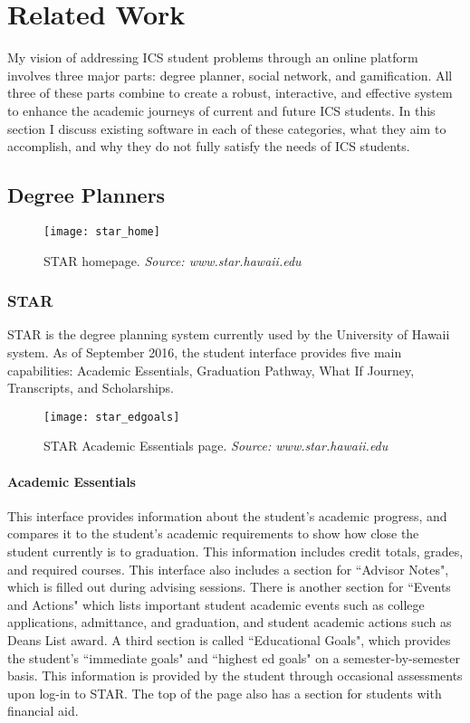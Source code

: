 \chapter{Related Work}

My vision of addressing ICS student problems through an online platform involves three major parts: degree planner, social network, and gamification. All three of these parts combine to create a robust, interactive, and effective system to enhance the academic journeys of current and future ICS students. In this section I discuss existing software in each of these categories, what they aim to accomplish, and why they do not fully satisfy the needs of ICS students.

\section{Degree Planners}
\begin{figure}[h]
\centering
\texttt{[image: star\_home]}
\caption{STAR homepage. \textit{Source: www.star.hawaii.edu}}
\end{figure}
\subsection{STAR}
STAR is the degree planning system currently used by the University of Hawaii system. \cite{STAR} As of September 2016, the student interface provides five main capabilities: Academic Essentials, Graduation Pathway, What If Journey, Transcripts, and Scholarships. 

\begin{figure}[h]
\centering
\texttt{[image: star\_edgoals]}
\caption{STAR Academic Essentials page. \textit{Source: www.star.hawaii.edu}}
\end{figure}
\subsubsection{Academic Essentials}
This interface provides information about the student's academic progress, and compares it to the student's academic requirements to show how close the student currently is to graduation. This information includes credit totals, grades, and required courses. This interface also includes a section for ``Advisor Notes", which is filled out during advising sessions. There is another section for ``Events and Actions" which lists important student academic events such as college applications, admittance, and graduation, and student academic actions such as Deans List award. A third section is called ``Educational Goals", which provides the student's ``immediate goals" and ``highest ed goals" on a semester-by-semester basis. This information is provided by the student through occasional assessments upon log-in to STAR. The top of the page also has a section for students with financial aid.

